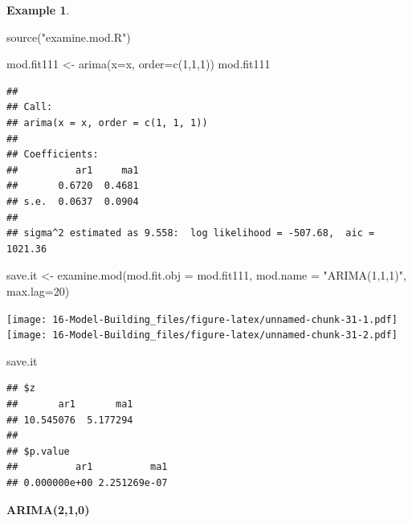 \documentclass[
]{book}
\newenvironment{Shaded}{\begin{snugshade}}{\end{snugshade}}
\newcommand{\AttributeTok}[1]{\textcolor[rgb]{0.77,0.63,0.00}{#1}}
\newcommand{\DecValTok}[1]{\textcolor[rgb]{0.00,0.00,0.81}{#1}}
\newcommand{\FunctionTok}[1]{\textcolor[rgb]{0.00,0.00,0.00}{#1}}
\newcommand{\NormalTok}[1]{#1}
\newcommand{\OtherTok}[1]{\textcolor[rgb]{0.56,0.35,0.01}{#1}}
\newcommand{\StringTok}[1]{\textcolor[rgb]{0.31,0.60,0.02}{#1}}
\theoremstyle{definition}
\theoremstyle{definition}
\newtheorem{example}{Example}[chapter]
\theoremstyle{definition}
\theoremstyle{definition}
\theoremstyle{remark}
\begin{document}
\begin{example}
\begin{Shaded}
\begin{Highlighting}[]
\FunctionTok{source}\NormalTok{(}\StringTok{"examine.mod.R"}\NormalTok{)}
\end{Highlighting}
\end{Shaded}

\begin{Shaded}
\begin{Highlighting}[]
\NormalTok{mod.fit111 }\OtherTok{\textless{}{-}} \FunctionTok{arima}\NormalTok{(}\AttributeTok{x=}\NormalTok{x, }\AttributeTok{order=}\FunctionTok{c}\NormalTok{(}\DecValTok{1}\NormalTok{,}\DecValTok{1}\NormalTok{,}\DecValTok{1}\NormalTok{))}
\NormalTok{mod.fit111}
\end{Highlighting}
\end{Shaded}

\begin{verbatim}
## 
## Call:
## arima(x = x, order = c(1, 1, 1))
## 
## Coefficients:
##          ar1     ma1
##       0.6720  0.4681
## s.e.  0.0637  0.0904
## 
## sigma^2 estimated as 9.558:  log likelihood = -507.68,  aic = 1021.36
\end{verbatim}

\begin{Shaded}
\begin{Highlighting}[]
\NormalTok{save.it }\OtherTok{\textless{}{-}} \FunctionTok{examine.mod}\NormalTok{(}\AttributeTok{mod.fit.obj =}\NormalTok{ mod.fit111, }\AttributeTok{mod.name =} \StringTok{"ARIMA(1,1,1)"}\NormalTok{, }\AttributeTok{max.lag=}\DecValTok{20}\NormalTok{)}
\end{Highlighting}
\end{Shaded}

\texttt{[image: 16-Model-Building\_files/figure-latex/unnamed-chunk-31-1.pdf]} \texttt{[image: 16-Model-Building\_files/figure-latex/unnamed-chunk-31-2.pdf]}

\begin{Shaded}
\begin{Highlighting}[]
\NormalTok{save.it}
\end{Highlighting}
\end{Shaded}

\begin{verbatim}
## $z
##       ar1       ma1 
## 10.545076  5.177294 
## 
## $p.value
##          ar1          ma1 
## 0.000000e+00 2.251269e-07
\end{verbatim}

\textbf{ARIMA(2,1,0)}


\end{example}
\end{document}
